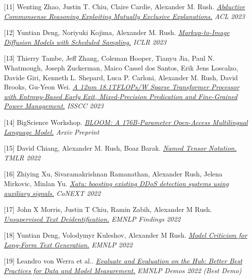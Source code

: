 \documentclass[10pt]{article}
\begin{document}
\medskip


[11] \ind Wenting Zhao, Justin T. Chiu, Claire Cardie, Alexander M. Rush. \emph{\href{ https://arxiv.org/pdf/2305.14618.pdf }{ Abductive Commonsense Reasoning Exploiting Mutually Exclusive Explanations.} }\emph{ ACL 2023 }

\medskip


[12] \ind Yuntian Deng, Noriyuki Kojima, Alexander M. Rush. \emph{\href{ https://arxiv.org/abs/2210.05147 }{ Markup-to-Image Diffusion Models with Scheduled Sampling.} }\emph{ ICLR 2023 }

\medskip


[13] \ind Thierry Tambe, Jeff Zhang, Coleman Hooper, Tianyu Jia, Paul N. Whatmough, Joseph Zuckerman, Maico Cassel dos Santos, Erik Jens Loscalzo, Davide Giri, Kenneth L. Shepard, Luca P. Carloni, Alexander M. Rush, David Brooks, Gu-Yeon Wei. \emph{\href{ None }{ A 12nm 18.1TFLOPs/W Sparse Transformer Processor with Entropy-Based Early Exit, Mixed-Precision Predication and Fine-Grained Power Management.} }\emph{ ISSCC 2023 }

\medskip


[14] \ind BigScience Workshop. \emph{\href{ https://arxiv.org/abs/2211.05100 }{ BLOOM: A 176B-Parameter Open-Access Multilingual Language Model.} }\emph{ Arxiv Preprint }

\medskip


[15] \ind David Chiang, Alexander M. Rush, Boaz Barak. \emph{\href{ https://arxiv.org/pdf/2102.13196.pdf }{ Named Tensor Notation.} }\emph{ TMLR 2022 }

\medskip


[16] \ind Zhiying Xu, Sivaramakrishnan Ramanathan, Alexander Rush, Jelena Mirkovic, Minlan Yu. \emph{\href{ https://dl.acm.org/doi/abs/10.1145/3555050.3569121 }{ Xatu: boosting existing DDoS detection systems using auxiliary signals.} }\emph{ CoNEXT 2022 }

\medskip


[17] \ind John X Morris, Justin T Chiu, Ramin Zabih, Alexander M Rush. \emph{\href{ https://arxiv.org/pdf/2210.11528.pdf }{ Unsupervised Text Deidentification.} }\emph{ EMNLP Findings 2022 }

\medskip


[18] \ind Yuntian Deng, Volodymyr Kuleshov, Alexander M Rush. \emph{\href{ https://arxiv.org/pdf/2210.08444.pdf }{ Model Criticism for Long-Form Text Generation.} }\emph{ EMNLP 2022 }

\medskip


[19] \ind Leandro von Werra et al.. \emph{\href{ https://arxiv.org/abs/2210.01970 }{ Evaluate and Evaluation on the Hub: Better Best Practices for Data and Model Measurement.} }\emph{ EMNLP Demos 2022 (Best Demo) }
\end{document}
